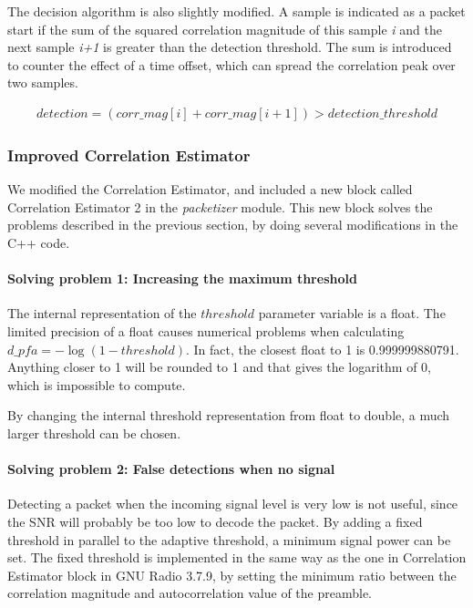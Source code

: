 The decision algorithm is also slightly modified. A sample is indicated as a packet start if the sum of the squared correlation magnitude of this sample \textit{i} and the next sample \textit{i+1} is greater than the detection threshold. The sum is introduced to counter the effect of a time offset, which can spread the correlation peak over two samples.

\begin{align*}
	detection = (corr\_mag[i] + corr\_mag[i+1]) > detection\_threshold
\end{align*}
\smallskip


\subsubsection{Improved Correlation Estimator}
We modified the Correlation Estimator, and included a new block called Correlation Estimator 2 in the \textit{packetizer} module. This new block solves the problems described in the previous section, by doing several modifications in the C++ code.

\paragraph*{Solving problem 1: Increasing the maximum threshold}

The internal representation of the $threshold$ parameter variable is a float. The limited precision of a float causes numerical problems when calculating \( d\_pfa = -\log (1- threshold)\). In fact, the closest float to 1 is 0.999999880791. Anything closer to 1 will be rounded to 1 and that gives the logarithm of 0, which is impossible to compute. \medskip

By changing the internal threshold representation from float to double, a much larger threshold can be chosen.

\paragraph*{Solving problem 2: False detections when no signal}
Detecting a packet when the incoming signal level is very low is not useful, since the SNR will probably be too low to decode the packet. By adding a fixed threshold in parallel to the adaptive threshold, a minimum signal power can be set. The fixed threshold is implemented in the same way as the one in Correlation Estimator block in GNU Radio 3.7.9, by setting the minimum ratio between the correlation magnitude and autocorrelation value of the preamble.

